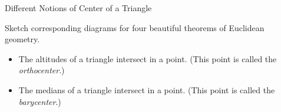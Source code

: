 \begin{exercise}{Different Notions of Center of a Triangle \Coffeecup}

Sketch corresponding diagrams for four beautiful theorems of Euclidean geometry.

\begin{itemize}

\item The altitudes of a triangle intersect in a point.  (This point is called the \emph{orthocenter}.)


\item The medians of a triangle intersect in a point.  (This point is called the \emph{barycenter}.)



\end{itemize}
\end{exercise}

